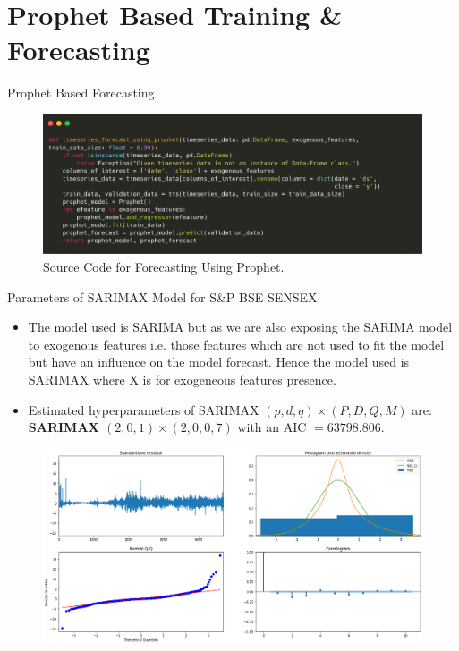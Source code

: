 \documentclass{beamer}
\begin{document}
\section{Prophet Based Training \& Forecasting}
\begin{frame}{Prophet Based Forecasting}
	\begin{figure}
		\centering
		\includegraphics[width = \textwidth]{images/timeseries_forecasting_using_prophet.png}
		\caption{Source Code for Forecasting Using Prophet.}
		\label{fig:my_label}
	\end{figure}
\end{frame}

\begin{frame}{Parameters of SARIMAX Model for S\&P BSE SENSEX}
	\begin{itemize}
		\item The model used is SARIMA but as we are also exposing the SARIMA model to exogenous features i.e. those features which are not used to fit the model but have an influence on the model forecast. Hence the model used is SARIMAX where X is for exogeneous features presence.
		      \pause
		\item Estimated hyperparameters of SARIMAX $(p, d, q) \times (P, D, Q, M)$ are: \textbf{SARIMAX $(2, 0, 1) \times (2, 0, 0, 7)$} with an AIC $=63798.806$.
	\end{itemize}
	\begin{figure}
		\centering
		\includegraphics[width = 0.75 \textwidth]{images/SENSEX Auto ARIMA Training Results}
		\caption{}
		\label{fig:my_label}
	\end{figure}
\end{frame}
\end{document}
